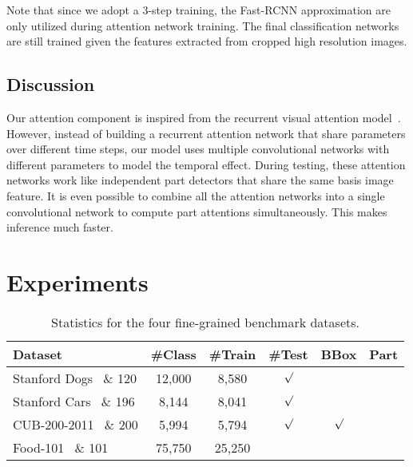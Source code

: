 \documentclass[10pt,twocolumn,letterpaper]{article}
\begin{document}
Note that since we adopt a 3-step training, the Fast-RCNN approximation are only utilized during attention network training.
The final classification networks are still trained given the features extracted from cropped high resolution images.

\subsection{Discussion}

Our attention component is inspired from the recurrent visual attention model~\cite{mnih2014recurrent}.
However, instead of building a recurrent attention network that share parameters over different time steps, our model uses multiple convolutional networks with different parameters to model the temporal effect.
During testing, these attention networks work like independent part detectors that share the same basis image feature.
It is even possible to combine all the attention networks into a single convolutional network to compute part attentions simultaneously.
This makes inference much faster.




\section{Experiments}

\begin{table}[t]
\begin{center}
\addtolength{\tabcolsep}{2.5pt}
\begin{tabular}{l c c c c c}
\toprule[0.2 em]
Dataset & \#Class & \#Train & \#Test & BBox & Part \\
\toprule[0.2 em]
Stanford Dogs~\cite{khosla2011novel} \& 120 & 12,000  &  8,580 & $\surd$ &    \\
Stanford Cars~\cite{krause20133d} \& 196 & 8,144  & 8,041 & $\surd$ &  \\
CUB-200-2011~\cite{wah2011caltech} \& 200 & 5,994 & 5,794 & $\surd$ & $\surd$ \\
Food-101~\cite{bossard2014food} \& 101 & 75,750 & 25,250 & $ $ & $ $ \\
\bottomrule[0.1 em]
\end{tabular}
\vspace{1pt}
\caption{Statistics for the four fine-grained benchmark datasets.}
\label{tab:statistics}
\end{center}
\end{table}
\end{document}
